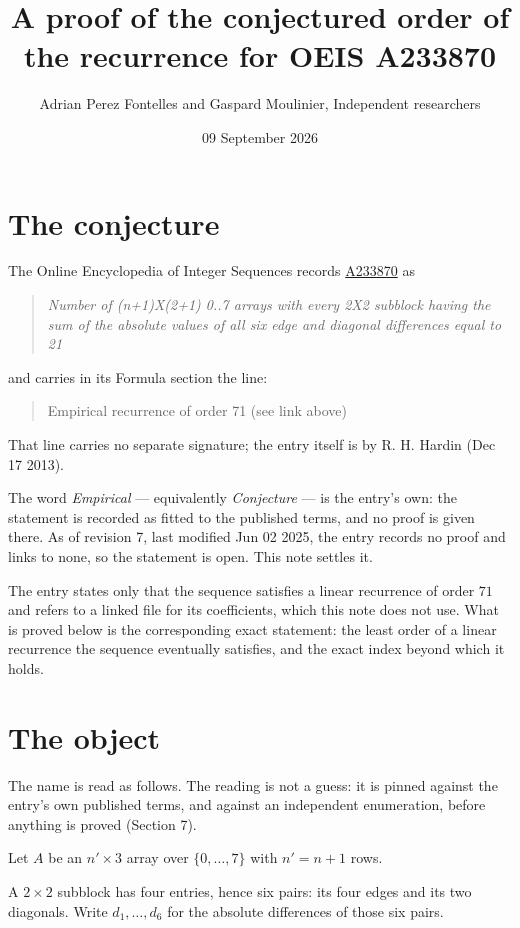 \documentclass[11pt]{article}
\title{A proof of the conjectured order of the recurrence for OEIS A233870}
\author{Adrian Perez Fontelles and Gaspard Moulinier, Independent researchers}
\date{09 September 2026}
\theoremstyle{definition}
\begin{document}
\maketitle
\section{The conjecture}

The Online Encyclopedia of Integer Sequences records \href{https://oeis.org/A233870}{A233870} as

\begin{quote}\itshape Number of (n+1)X(2+1) 0..7 arrays with every 2X2 subblock having the sum of the absolute values of all six edge and diagonal differences equal to 21\end{quote}

and carries in its Formula section the line:

\begin{quote}\ttfamily Empirical recurrence of order 71 (see link above)\end{quote}

That line carries no separate signature; the entry itself is by R. H. Hardin (Dec 17 2013).

The word {\itshape Empirical} --- equivalently {\itshape Conjecture} --- is the entry's own: the statement is recorded as fitted to the published terms, and no proof is given there. As of revision 7, last modified Jun 02 2025, the entry records no proof and links to none, so the statement is open. This note settles it.

The entry states only that the sequence satisfies a linear recurrence of order $71$ and refers to a linked file for its coefficients, which this note does not use. What is proved below is the corresponding exact statement: the least order of a linear recurrence the sequence eventually satisfies, and the exact index beyond which it holds.

\section{The object}

The name is read as follows. The reading is not a guess: it is pinned against the entry's own published terms, and against an independent enumeration, before anything is proved (Section 7).

Let $A$ be an $n' \times 3$ array over $\{0,\dots,7\}$ with $n' = n + 1$ rows.

A $2\times2$ subblock has four entries, hence six pairs: its four edges and its two diagonals. Write $d_1,\dots,d_6$ for the absolute differences of those six pairs.
\end{document}
